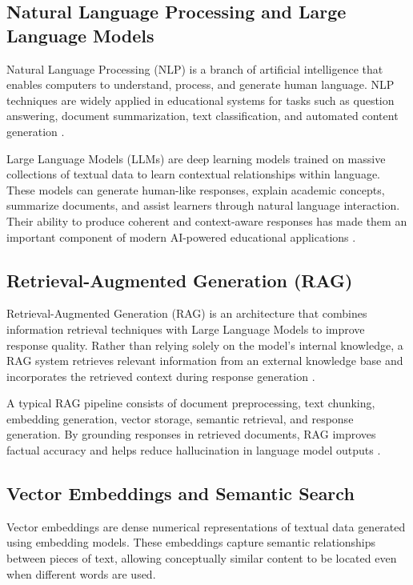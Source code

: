 \subsection{Natural Language Processing and Large Language Models}
Natural Language Processing (NLP) is a branch of artificial intelligence that enables computers to understand, process, and generate human language. NLP techniques are widely applied in educational systems for tasks such as question answering, document summarization, text classification, and automated content generation \cite{2yadav2022summarization,4gan2023llmeducation}. \par

Large Language Models (LLMs) are deep learning models trained on massive collections of textual data to learn contextual relationships within language. These models can generate human-like responses, explain academic concepts, summarize documents, and assist learners through natural language interaction. Their ability to produce coherent and context-aware responses has made them an important component of modern AI-powered educational applications \cite{4gan2023llmeducation}. \par

\subsection{Retrieval-Augmented Generation (RAG)}
Retrieval-Augmented Generation (RAG) is an architecture that combines information retrieval techniques with Large Language Models to improve response quality. Rather than relying solely on the model's internal knowledge, a RAG system retrieves relevant information from an external knowledge base and incorporates the retrieved context during response generation \cite{5lewis2020rag}. \par

A typical RAG pipeline consists of document preprocessing, text chunking, embedding generation, vector storage, semantic retrieval, and response generation. By grounding responses in retrieved documents, RAG improves factual accuracy and helps reduce hallucination in language model outputs \cite{5lewis2020rag}. \par

\subsection{Vector Embeddings and Semantic Search}

Vector embeddings are dense numerical representations of textual data generated using embedding models. These embeddings capture semantic relationships between pieces of text, allowing conceptually similar content to be located even when different words are used. \par

